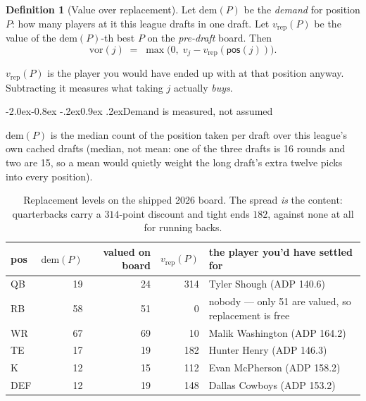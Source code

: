 \documentclass[10pt,a4paper]{article}
\makeatletter
\theoremstyle{plain}
\theoremstyle{definition}
\newtheorem{definition}[theorem]{Definition}
\theoremstyle{remark}
\newcommand{\pos}{\mathsf{pos}}
\renewcommand\subsection{\@startsection{subsection}{2}{\z@}%
  {-2.0ex\@plus -0.8ex \@minus -.2ex}{0.9ex \@plus .2ex}{\normalfont\large\bfseries}}
\makeatother
\begin{document}
\begin{definition}[Value over replacement]
Let $\mathrm{dem}(P)$ be the \emph{demand} for position $P$: how many players at it this
league drafts in one draft. Let $v_{\mathrm{rep}}(P)$ be the value of the
$\mathrm{dem}(P)$-th best $P$ on the \emph{pre-draft} board. Then
\begin{equation}
\mathrm{vor}(j) \;=\; \max\big(0,\; v_j - v_{\mathrm{rep}}(\pos(j))\big).
\label{eq:vor}
\end{equation}
\end{definition}

$v_{\mathrm{rep}}(P)$ is the player you would have ended up with at that position anyway.
Subtracting it measures what taking $j$ actually \emph{buys}.

\subsection{Demand is measured, not assumed}

$\mathrm{dem}(P)$ is the median count of the position taken per draft over this league's
own cached drafts (median, not mean: one of the three drafts is 16 rounds and two are 15,
so a mean would quietly weight the long draft's extra twelve picks into every position).

\begin{table}[htbp]
\centering
\small
\begin{tabular}{lrrrl}
\toprule
pos & $\mathrm{dem}(P)$ & valued on board & $v_{\mathrm{rep}}(P)$ & the player you'd have settled for \\
\midrule
QB  & 19 & 24 & 314 & Tyler Shough (ADP 140.6) \\
RB  & 58 & 51 & 0   & nobody --- only 51 are valued, so replacement is free \\
WR  & 67 & 69 & 10  & Malik Washington (ADP 164.2) \\
TE  & 17 & 19 & 182 & Hunter Henry (ADP 146.3) \\
K   & 12 & 15 & 112 & Evan McPherson (ADP 158.2) \\
DEF & 12 & 19 & 148 & Dallas Cowboys (ADP 153.2) \\
\bottomrule
\end{tabular}
\caption{Replacement levels on the shipped 2026 board. The spread \emph{is} the content:
quarterbacks carry a $314$-point discount and tight ends $182$, against none at all for
running backs.}
\label{tab:vor}
\end{table}
\end{document}
